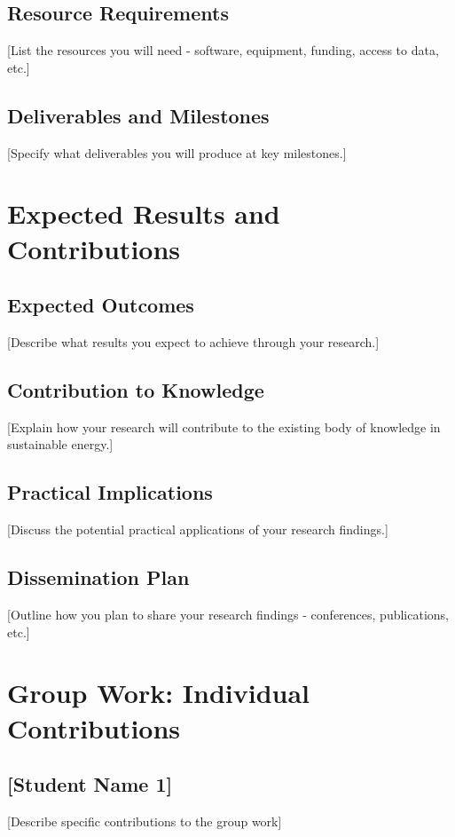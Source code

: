 \documentclass[12pt,a4paper]{article}
\begin{document}
\subsection{Resource Requirements}
[List the resources you will need - software, equipment, funding, access to data, etc.]

\subsection{Deliverables and Milestones}
[Specify what deliverables you will produce at key milestones.]

\section{Expected Results and Contributions}
\label{sec:results}

\subsection{Expected Outcomes}
[Describe what results you expect to achieve through your research.]

\subsection{Contribution to Knowledge}
[Explain how your research will contribute to the existing body of knowledge in sustainable energy.]

\subsection{Practical Implications}
[Discuss the potential practical applications of your research findings.]

\subsection{Dissemination Plan}
[Outline how you plan to share your research findings - conferences, publications, etc.]


\clearpage

\section*{Group Work: Individual Contributions}
\label{sec:contributions}

\subsection*{[Student Name 1]}
[Describe specific contributions to the group work]
\end{document}
